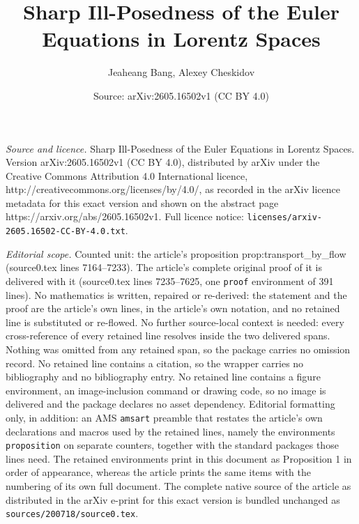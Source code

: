 \documentclass[10pt,a4paper]{amsart}
\title{Sharp Ill-Posedness of the Euler Equations in Lorentz Spaces}
\author{Jeaheang Bang, Alexey Cheskidov}
\date{Source: arXiv:2605.16502v1 (CC BY 4.0)}
\begin{document}
\maketitle

\noindent\emph{Source and licence.} Sharp Ill-Posedness of the Euler Equations in Lorentz Spaces. Version arXiv:2605.16502v1 (CC BY 4.0), distributed by arXiv under the Creative Commons Attribution 4.0 International licence, http://creativecommons.org/licenses/by/4.0/, as recorded in the arXiv licence metadata for this exact version and shown on the abstract page https://arxiv.org/abs/2605.16502v1. Full licence notice: \texttt{licenses/arxiv-2605.16502-CC-BY-4.0.txt}.\par\smallskip

\noindent\textit{Editorial scope.} Counted unit: the article's proposition prop:transport\_by\_flow (source0.tex lines 7164--7233). The article's complete original proof of it is delivered with it (source0.tex lines 7235--7625, one \texttt{proof} environment of 391 lines). No mathematics is written, repaired or re-derived: the statement and the proof are the article's own lines, in the article's own notation, and no retained line is substituted or re-flowed.  No further source-local context is needed: every cross-reference of every retained line resolves inside the two delivered spans.  Nothing was omitted from any retained span, so the package carries no omission record.  No retained line contains a citation, so the wrapper carries no bibliography and no bibliography entry.  No retained line contains a figure environment, an image-inclusion command or drawing code, so no image is delivered and the package declares no asset dependency.  Editorial formatting only, in addition: an AMS \texttt{amsart} preamble that restates the article's own declarations and macros used by the retained lines, namely the environments \texttt{proposition} on separate counters, together with the standard packages those lines need.  The retained environments print in this document as Proposition 1 in order of appearance, whereas the article prints the same items with the numbering of its own full document.  The complete native source of the article as distributed in the arXiv e-print for this exact version is bundled unchanged as \texttt{sources/200718/source0.tex}.
\end{document}
